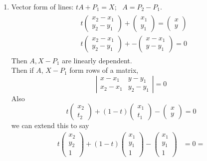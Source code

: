 \documentclass[twoside]{amsart}
\theoremstyle{plain}
\theoremstyle{definition}
\newcommand{\exercisehead}[1]
  {
   \noindent{\small\bf Exercise #1.}
   \smallskip}
\begin{document}
\exercisehead{6} 
\begin{enumerate}
\item Vector form of lines: $tA + P_1= X$; \, $A = P_2 - P_1$.  
\[
\begin{gathered}
  \begin{aligned}
    & t \left( \begin{matrix} x_2 - x_1 \\ y_2 - y_1 \end{matrix} \right) + \left( \begin{matrix} x_1 \\ y_1 \end{matrix}\right) = \left( \begin{matrix} x \\ y \end{matrix} \right) \\
    & t \left( \begin{matrix} x_2 - x_1 \\ y_2 - y_1 \end{matrix} \right) + -\left( \begin{matrix} x-x_1 \\ y-y_1 \end{matrix} \right) = 0  
\end{aligned}
\end{gathered}
\]
Then $A, X-P_1$ are linearly dependent.  \\
Then if $A$, $X-P_1$ form rows of a matrix, 
\[
\left| \begin{matrix} x-x_1 & y-y_1 \\ x_2-x_1 & y_2 - y_1 \end{matrix} \right| = 0 
\]
Also
\[
t \left( \begin{matrix} x_2 \\ t_2 \end{matrix} \right) + (1-t)\left( \begin{matrix} x_1 \\ t_1 \end{matrix} \right) - \left( \begin{matrix} x \\ y \end{matrix} \right) = 0 
\]
we can extend this to say
\[
\begin{aligned}
  t \left( \begin{matrix} x_2 \\ y_2 \\ 1 \end{matrix} \right) + (1-t) \left( \begin{matrix} x_1 \\ y_1 \\ 1 \end{matrix} \right) - \left( \begin{matrix} x_1 \\ y_1 \\ 1 \end{matrix} \right) & = 0 = \\

\end{aligned}\]
\end{enumerate}
\end{document}
